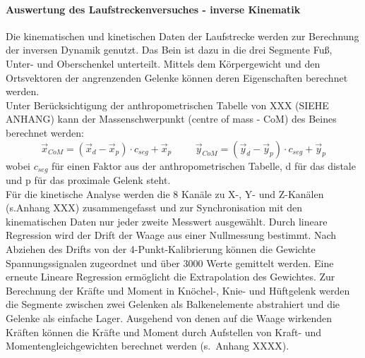 \paragraph{Auswertung des Laufstreckenversuches - inverse Kinematik}
Die kinematischen und kinetischen Daten der Laufstrecke werden zur Berechnung der inversen Dynamik genutzt. Das Bein ist dazu in die drei Segmente Fuß, Unter- und Oberschenkel unterteilt. Mittels dem Körpergewicht und den Ortsvektoren der angrenzenden Gelenke können deren Eigenschaften berechnet werden.\\
Unter Berücksichtigung der anthropometrischen Tabelle von XXX (SIEHE ANHANG) kann der Massenschwerpunkt (centre of mass - CoM) des Beines berechnet werden:
\begin{equation}
\vec{x}_{CoM} = (\vec{x}_d - \vec{x}_p) \cdot c_{seg} + \vec{x}_p \hspace{1cm} \vec{y}_{CoM} = (\vec{y}_d - \vec{y}_p) \cdot c_{seg} + \vec{y}_p
\label{eq:CoM_x}
\end{equation}
wobei $c_{seg}$ für einen Faktor aus der anthropometrischen Tabelle, d für das distale und p für das proximale Gelenk steht.\\
Für die kinetische Analyse werden die 8 Kanäle zu X-, Y- und Z-Kanälen (s.Anhang XXX) zusammengefasst und zur Synchronisation mit den kinematischen Daten nur jeder zweite Messwert ausgewählt. Durch lineare Regression wird der Drift der Waage aus einer Nullmessung bestimmt. Nach Abziehen des Drifts von der 4-Punkt-Kalibrierung können die Gewichte Spannungssignalen zugeordnet und über 3000 Werte gemittelt werden. Eine erneute Lineare Regression ermöglicht die Extrapolation des Gewichtes.
Zur Berechnung der Kräfte und Moment in Knöchel-, Knie- und Hüftgelenk werden die Segmente zwischen zwei Gelenken als Balkenelemente abstrahiert und die Gelenke als einfache Lager. Ausgehend von denen auf die Waage wirkenden Kräften können die Kräfte und Moment durch Aufstellen von Kraft- und Momentengleichgewichten berechnet werden (s.~Anhang XXXX).